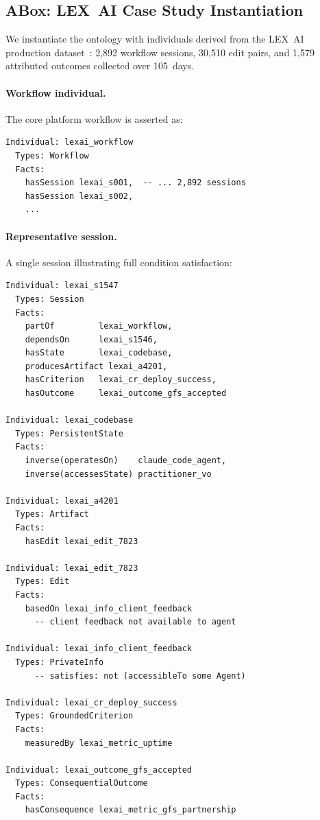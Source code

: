 \documentclass[11pt]{article}
\begin{document}
\subsection{ABox: LEX~AI Case Study Instantiation}
\label{sec:abox}

We instantiate the ontology with individuals derived from the LEX~AI production dataset~\citep{ovcharov2026edittrace}: 2{,}892 workflow sessions, 30{,}510 edit pairs, and 1{,}579 attributed outcomes collected over 105~days.

\paragraph{Workflow individual.}
The core platform workflow is asserted as:

\begin{small}
\begin{verbatim}
Individual: lexai_workflow
  Types: Workflow
  Facts:
    hasSession lexai_s001,  -- ... 2,892 sessions
    hasSession lexai_s002,
    ...
\end{verbatim}
\end{small}

\paragraph{Representative session.}
A single session illustrating full condition satisfaction:

\begin{small}
\begin{verbatim}
Individual: lexai_s1547
  Types: Session
  Facts:
    partOf         lexai_workflow,
    dependsOn      lexai_s1546,
    hasState       lexai_codebase,
    producesArtifact lexai_a4201,
    hasCriterion   lexai_cr_deploy_success,
    hasOutcome     lexai_outcome_gfs_accepted

Individual: lexai_codebase
  Types: PersistentState
  Facts:
    inverse(operatesOn)    claude_code_agent,
    inverse(accessesState) practitioner_vo

Individual: lexai_a4201
  Types: Artifact
  Facts:
    hasEdit lexai_edit_7823

Individual: lexai_edit_7823
  Types: Edit
  Facts:
    basedOn lexai_info_client_feedback
      -- client feedback not available to agent

Individual: lexai_info_client_feedback
  Types: PrivateInfo
      -- satisfies: not (accessibleTo some Agent)

Individual: lexai_cr_deploy_success
  Types: GroundedCriterion
  Facts:
    measuredBy lexai_metric_uptime

Individual: lexai_outcome_gfs_accepted
  Types: ConsequentialOutcome
  Facts:
    hasConsequence lexai_metric_gfs_partnership
\end{verbatim}
\end{small}
\end{document}
